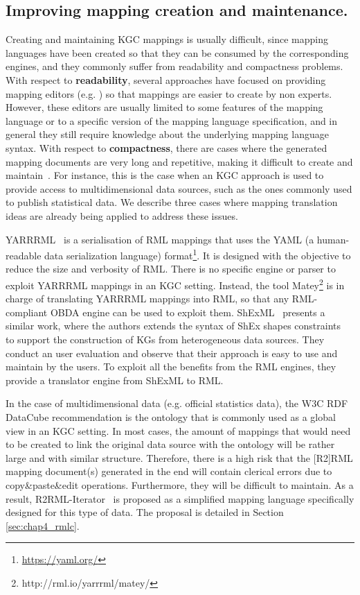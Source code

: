 \subsection{Improving mapping creation and maintenance.}

Creating and maintaining KGC mappings is usually difficult, since mapping languages have been created so that they can be consumed by the corresponding engines, and they commonly suffer from readability and compactness problems. With respect to \textbf{readability}, several approaches have focused on providing mapping editors (e.g. \citep{heyvaert2016rmleditor}) so that mappings are easier to create by non experts. However, these editors are usually limited to some features of the mapping language or to a specific version of the mapping language specification, and in general they still require knowledge about the underlying mapping language syntax. With respect to \textbf{compactness}, there are cases where the generated mapping documents are very long and repetitive, making it difficult to create and maintain~\citep{chaves2018virtual}. For instance, this is the case when an KGC approach is used to provide access to multidimensional data sources, such as the ones commonly used to publish statistical data. We describe three cases where mapping translation ideas are already being applied to address these issues. 

YARRRML~\citep{Heyvaert2018Declarative} is a serialisation of RML mappings that uses the YAML (a human-readable data serialization language) format\footnote{\url{https://yaml.org/}}. It is designed with the objective to reduce the size and verbosity of RML. There is no specific engine or parser to exploit YARRRML mappings in an KGC setting. Instead, the tool Matey\footnote{http://rml.io/yarrrml/matey/} is in charge of translating YARRRML mappings into RML, so that any RML-compliant OBDA engine can be used to exploit them. ShExML~\citep{garcia2020shexml} presents a similar work, where the authors extends the syntax of ShEx shapes constraints~\citep{prud2014shape} to support the construction of KGs from heterogeneous data sources. They conduct an user evaluation and observe that their approach is easy to use and maintain by the users. To exploit all the benefits from the RML engines, they provide a translator engine from ShExML to RML.

In the case of multidimensional data (e.g. official statistics data), the W3C RDF DataCube recommendation is the ontology that is commonly used as a global view in an KGC setting. In most cases, the amount of mappings that would need to be created to link the original data source with the ontology will be rather large and with similar structure. Therefore, there is a high risk that the [R2]RML mapping document(s) generated in the end will contain clerical errors due to copy\&paste\&edit operations. Furthermore, they will be difficult to maintain. As a result, R2RML-Iterator~\citep{chaves2018virtual} is proposed as a simplified mapping language specifically designed for this type of data. The proposal is detailed in Section \ref{sec:chap4_rmlc}.


